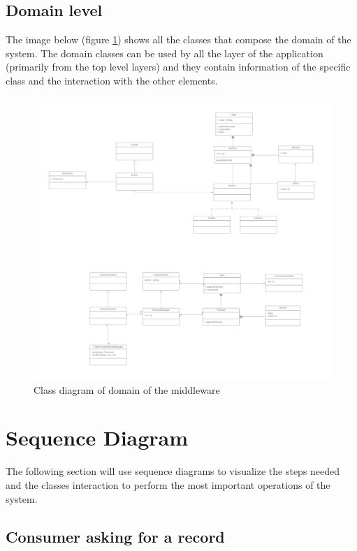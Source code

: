 \subsection{Domain level}

The image below (figure \ref{fig:class_diagram_domain}) shows all the classes
that compose the domain of the system.
The domain classes can be used by all the layer of the application (primarily
from the top level layers) and they contain information of the specific class
and the interaction with the other elements.

\begin{figure}[H]
    \centering
    \includegraphics[width=1.0\textwidth]{Figures/class_diagram_domain.png}
    \caption{Class diagram of domain of the middleware}
    \label{fig:class_diagram_domain}
\end{figure}

\section{Sequence Diagram}

The following section will use sequence diagrams to visualize the steps needed 
and the classes interaction to perform the most important operations of the
system.

\subsection{Consumer asking for a record}

